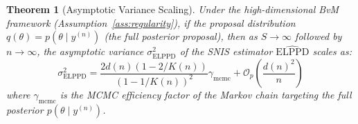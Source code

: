 \documentclass[12pt]{article}
\newtheorem{theorem}{Theorem}
\begin{document}
\begin{theorem}[Asymptotic Variance Scaling]\label{thm:variance_scaling}
Under the high-dimensional BvM framework (Assumption~\ref{ass:regularity}), if the proposal distribution $q(\theta) = p(\theta \mid y^{(n)})$ (the full posterior proposal), then as $S \to \infty$ followed by $n \to \infty$, the asymptotic variance $\sigma^2_{\mathrm{ELPPD}}$ of the SNIS estimator $\widehat{\text{ELPPD}}$ scales as:
\begin{equation}
\sigma^2_{\mathrm{ELPPD}} = \frac{2 d(n) (1 - 2/K(n))}{(1 - 1/K(n))^2} \gamma_{\mathrm{mcmc}} + \mathcal{O}_p\left( \frac{d(n)^2}{n} \right)
\end{equation}
where $\gamma_{\mathrm{mcmc}}$ is the MCMC efficiency factor of the Markov chain targeting the full posterior $p(\theta \mid y^{(n)})$.
\end{theorem}
\end{document}
